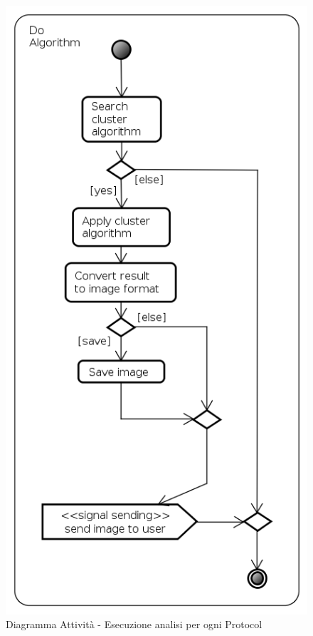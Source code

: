\begin{figure}[!h]
\centering
\includegraphics[width=0.48\linewidth]{./Content/Immagini/DoAl}
\caption{Diagramma Attività - Esecuzione analisi per ogni Protocol}
\label{DoB}
\end{figure}
